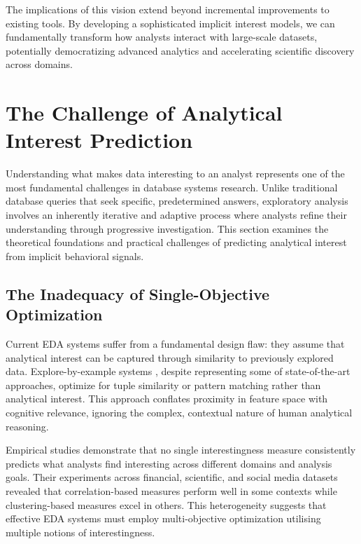 \documentclass[sigconf, nonacm]{acmart}
\begin{document}
The implications of this vision extend beyond incremental improvements to existing tools. By developing a sophisticated implicit interest models, we can fundamentally transform how analysts interact with large-scale datasets, potentially democratizing advanced analytics and accelerating scientific discovery across domains.


\section{The Challenge of Analytical Interest Prediction}

Understanding what makes data interesting to an analyst represents one of the most fundamental challenges in database systems research. Unlike traditional database queries that seek specific, predetermined answers, exploratory analysis involves an inherently iterative and adaptive process where analysts refine their understanding through progressive investigation. This section examines the theoretical foundations and practical challenges of predicting analytical interest from implicit behavioral signals.

\subsection{The Inadequacy of Single-Objective Optimization}

Current EDA systems suffer from a fundamental design flaw: they assume that analytical interest can be captured through similarity to previously explored data. Explore-by-example systems \cite{dimitriadouAIDEActiveLearningBased2016, mottin2014exemplar, bonifati2014interactive}, despite representing some of state-of-the-art approaches, optimize for tuple similarity or pattern matching rather than analytical interest. This approach conflates proximity in feature space with cognitive relevance, ignoring the complex, contextual nature of human analytical reasoning.

Empirical studies \cite{somechPredictingWhatInteresting2019} demonstrate that no single interestingness measure consistently predicts what analysts find interesting across different domains and analysis goals. Their experiments across financial, scientific, and social media datasets revealed that correlation-based measures perform well in some contexts while clustering-based measures excel in others. This heterogeneity suggests that effective EDA systems must employ multi-objective optimization utilising multiple notions of interestingness.
\end{document}
